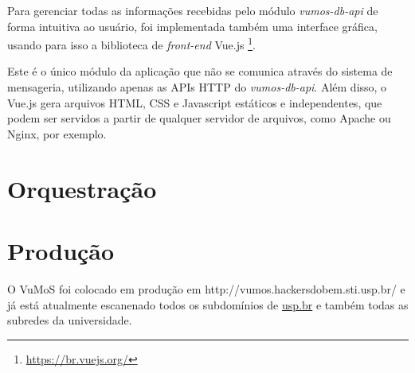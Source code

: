     Para gerenciar todas as informações recebidas pelo módulo \textit{vumos-db-api} de forma intuitiva ao usuário, foi implementada também uma interface gráfica, usando para isso a biblioteca de \textit{front-end} Vue.js \footnote{\url{https://br.vuejs.org/}}. 
    
    Este é o único módulo da aplicação que não se comunica através do sistema de mensageria, utilizando apenas as APIs HTTP do \textit{vumos-db-api}. Além disso, o Vue.js gera arquivos HTML, CSS e Javascript estáticos e independentes, que podem ser servidos a partir de qualquer servidor de arquivos, como Apache ou Nginx, por exemplo. 
    
    
    

\section{Orquestração}
    

\section{Produção}
    O VuMoS foi colocado em produção em http://vumos.hackersdobem.sti.usp.br/ e já está atualmente escanenado todos os subdomínios de \url{usp.br} e também todas as subredes da universidade. 

